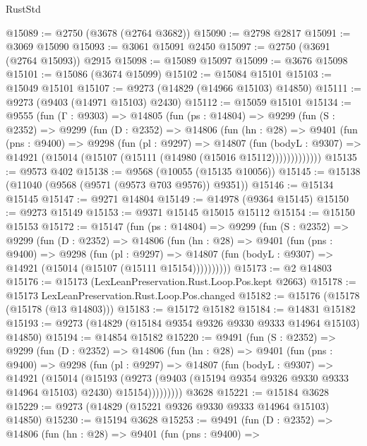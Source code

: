 \begin{lexlean}{RustStd}
\begin{coremodule}
@15089 := @2750 (@3678 (@2764 @3682))
@15090 := @2798 @2817
@15091 := @3069 @15090
@15093 := @3061 @15091 @2450
@15097 := @2750 (@3691 (@2764 @15093)) @2915
@15098 := @15089 @15097
@15099 := @3676 @15098
@15101 := @15086 (@3674 @15099)
@15102 := @15084 @15101
@15103 := @15049 @15101
@15107 := @9273 (@14829 (@14966 @15103) @14850)
@15111 := @9273 (@9403 (@14971 @15103) @2430)
@15112 := @15059 @15101
@15134 := @9555
    (fun (Γ : @9303) =>
    @14805
      (fun (ps : @14804) =>
      @9299
        (fun (S : @2352) =>
        @9299
          (fun (D : @2352) =>
          @14806
            (fun (hn : @28) =>
            @9401
              (fun (pns : @9400) =>
              @9298
                (fun (pl : @9297) =>
                @14807
                  (fun (bodyL : @9307) =>
                  @14921 (@15014 (@15107 (@15111 (@14980 (@15016 @15112)))))))))))))
@15135 := @9573 @402
@15138 := @9568 (@10055 (@15135 @10056))
@15145 := @15138 (@11040 (@9568 (@9571 (@9573 @703 @9576)) @9351))
@15146 := @15134 @15145
@15147 := @9271 @14804
@15149 := @14978 (@9364 @15145)
@15150 := @9273 @15149
@15153 := @9371 @15145 @15015 @15112
@15154 := @15150 @15153
@15172 := @15147
    (fun (ps : @14804) =>
    @9299
      (fun (S : @2352) =>
      @9299
        (fun (D : @2352) =>
        @14806
          (fun (hn : @28) =>
          @9401
            (fun (pns : @9400) =>
            @9298
              (fun (pl : @9297) =>
              @14807 (fun (bodyL : @9307) => @14921 (@15014 (@15107 (@15111 @15154))))))))))
@15173 := @2 @14803
@15176 := @15173 (LexLeanPreservation.Rust.Loop.Pos.kept @2663)
@15178 := @15173 LexLeanPreservation.Rust.Loop.Pos.changed
@15182 := @15176 (@15178 (@15178 (@13 @14803)))
@15183 := @15172 @15182
@15184 := @14831 @15182
@15193 := @9273 (@14829 (@15184 @9354 @9326 @9330 @9333 @14964 @15103) @14850)
@15194 := @14854 @15182
@15220 := @9491
    (fun (S : @2352) =>
    @9299
      (fun (D : @2352) =>
      @14806
        (fun (hn : @28) =>
        @9401
          (fun (pns : @9400) =>
          @9298
            (fun (pl : @9297) =>
            @14807
              (fun (bodyL : @9307) =>
              @14921
                (@15014
                  (@15193
                    (@9273
                      (@9403 (@15194 @9354 @9326 @9330 @9333 @14964 @15103) @2430)
                      @15154)))))))))
    @3628
@15221 := @15184 @3628
@15229 := @9273 (@14829 (@15221 @9326 @9330 @9333 @14964 @15103) @14850)
@15230 := @15194 @3628
@15253 := @9491
    (fun (D : @2352) =>
    @14806
      (fun (hn : @28) =>
      @9401
        (fun (pns : @9400) =>

\end{coremodule}
\end{lexlean}
